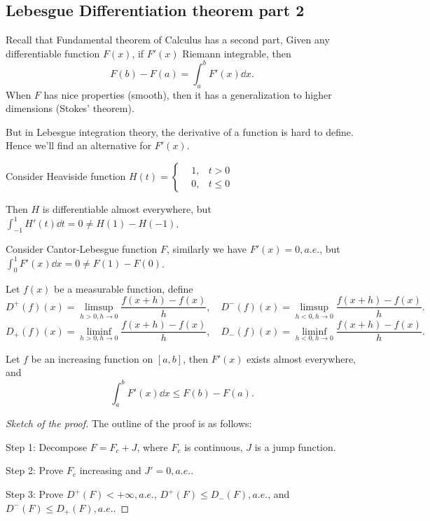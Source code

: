 \subsection{Lebesgue Differentiation theorem part 2}
\label{sub:Lebesgue Differentiation theorem part 2}

Recall that Fundamental theorem of Calculus has a second part,
Given any differentiable function $F(x)$, if $F'(x)$ Riemann integrable,
then
 \[
F(b)-F(a) = \int_a^b F'(x)\dd x.
\]
When $F$ has nice properties (smooth), then it has a generalization to
higher dimensions (Stokes' theorem).

But in Lebesgue integration theory, the derivative of a function
is hard to define. Hence we'll find an alternative for $F'(x)$.

\begin{example}
	Consider Heaviside function $H(t) = \left\{\begin{aligned}
			&1, &t>0\\ &0, &t\le 0
    \end{aligned} \right.$

	Then $H$ is differentiable almost everywhere,
	but $\int_{-1}^1 H'(t)\dd t = 0 \ne H(1)-H(-1)$.
\end{example}
\begin{example}
    Consider Cantor-Lebesgue function $F$,
	similarly we have $F'(x)=0, a.e.$,
	but  $\int_0^1 F'(x)\dd x = 0\ne F(1)-F(0)$.
\end{example}

\begin{definition}
	Let $f(x)$ be a measurable function, define
	\[
	D^+(f)(x) = \limsup_{h>0, h\to 0}\frac{f(x+h)-f(x)}{h},\quad
	D^-(f)(x) = \limsup_{h<0, h\to 0}\frac{f(x+h)-f(x)}{h}.
	\]
	\[
	D_+(f)(x) = \liminf_{h>0, h\to 0}\frac{f(x+h)-f(x)}{h},\quad
	D_-(f)(x) = \liminf_{h<0, h\to 0}\frac{f(x+h)-f(x)}{h}.
	\]
\end{definition}

\begin{theorem}
	Let $f$ be an increasing function on $[a,b]$,
	then $F'(x)$ exists almost everywhere, and
	\[
	\int_{a}^{b} F'(x)\dd x \le F(b) - F(a).
	\]
\end{theorem}
\begin{proof}[Sketch of the proof]
	The outline of the proof is as follows:

    Step 1: Decompose $F = F_c + J$, where $F_c$ is continuous, $J$ is a jump function.

	Step 2: Prove $F_c$ increasing and  $J'=0, a.e.$.

	Step 3: Prove $D^+(F)<+\infty, a.e.$, $D^+(F)\le D_-(F), a.e.$,
	and $D^-(F)\le D_+(F),a.e.$.
\end{proof}

